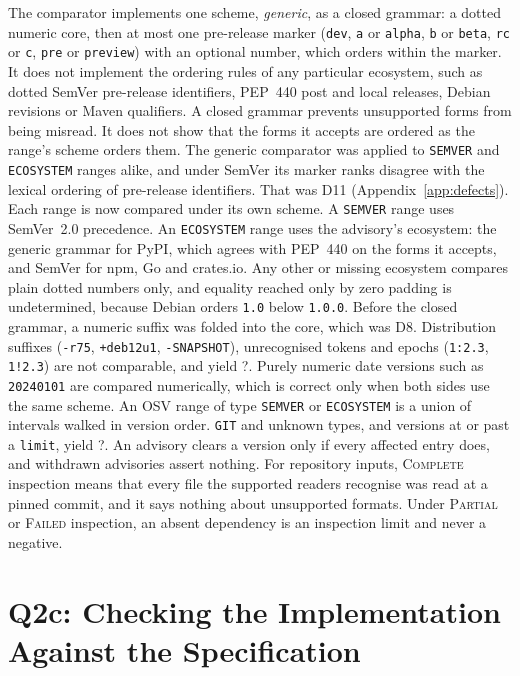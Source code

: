 \documentclass[11pt,a4paper]{article}
\newcommand{\code}[1]{\texttt{#1}}
\newcommand{\Ind}{\textsf{?}}
\begin{document}
The comparator implements one scheme, \emph{generic}, as a closed
grammar: a dotted numeric core, then at most one pre-release marker
(\code{dev}, \code{a} or \code{alpha}, \code{b} or \code{beta},
\code{rc} or \code{c}, \code{pre} or \code{preview}) with an optional
number, which orders within the marker. It does not implement the
ordering rules of any particular ecosystem, such as dotted SemVer
pre-release identifiers, PEP~440 post and local releases, Debian
revisions or Maven qualifiers. A closed grammar prevents
unsupported forms from being misread. It does not show that the forms
it accepts are ordered as the range's scheme orders them. The generic
comparator was applied to \code{SEMVER} and \code{ECOSYSTEM} ranges
alike, and under SemVer its marker ranks disagree with the lexical
ordering of pre-release identifiers. That was D11
(Appendix~\ref{app:defects}). Each range is now compared under its own
scheme. A \code{SEMVER} range uses SemVer~2.0 precedence. An
\code{ECOSYSTEM} range uses the advisory's ecosystem: the generic
grammar for PyPI, which agrees with PEP~440 on the forms it accepts,
and SemVer for npm, Go and crates.io. Any other or missing ecosystem
compares plain dotted numbers only, and equality reached only by zero
padding is undetermined, because Debian orders \code{1.0} below
\code{1.0.0}. Before the closed grammar, a numeric suffix was folded
into the core, which was D8.
Distribution suffixes (\code{-r75},
\code{+deb12u1}, \code{-SNAPSHOT}), unrecognised tokens and epochs
(\code{1:2.3}, \code{1!2.3}) are not comparable, and yield \Ind{}.
Purely numeric date versions such as \code{20240101} are compared
numerically, which is correct only when both sides use the same
scheme. An OSV range of type \code{SEMVER} or \code{ECOSYSTEM} is a
union of intervals walked in version order. \code{GIT} and unknown
types, and versions at or past a \code{limit}, yield \Ind{}. An
advisory clears a version only if every affected entry does, and
withdrawn advisories assert nothing. For repository inputs,
\textsc{Complete} inspection means that every file the supported
readers recognise was read at a pinned commit, and it says nothing
about unsupported formats. Under \textsc{Partial} or \textsc{Failed}
inspection, an absent dependency is an inspection limit and never a
negative.

\section{Q2c: Checking the Implementation Against the Specification}
\label{sec:audit}
\end{document}
